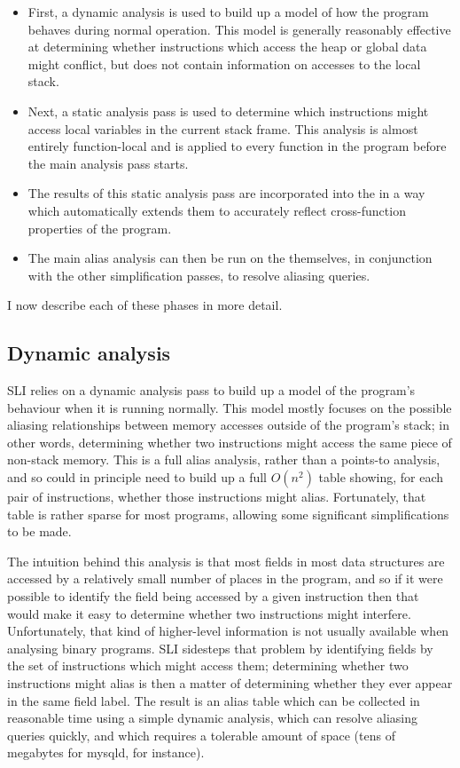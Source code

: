 \begin{itemize}
\item
  First, a dynamic analysis is used to build up a model of how the
  program behaves during normal operation.  This model is generally
  reasonably effective at determining whether instructions which
  access the heap or global data might conflict, but does not contain
  information on accesses to the local stack.
\item
  Next, a static analysis pass is used to determine which instructions
  might access local variables in the current stack frame.  This
  analysis is almost entirely function-local and is applied to every
  function in the program before the main analysis pass starts.
\item
  The results of this static analysis pass are incorporated into the
  {\StateMachines} in a way which automatically extends them to
  accurately reflect cross-function properties of the program.
\item
  The main alias analysis can then be run on the {\StateMachines}
  themselves, in conjunction with the other {\StateMachine}
  simplification passes, to resolve aliasing queries.
\end{itemize}

I now describe each of these phases in more detail.

\subsection{Dynamic analysis}

SLI relies on a dynamic analysis pass to build up a model of the
program's behaviour when it is running normally.  This model mostly
focuses on the possible aliasing relationships between memory accesses
outside of the program's stack; in other words, determining whether
two instructions might access the same piece of non-stack memory.
This is a full alias analysis, rather than a points-to analysis, and
so could in principle need to build up a full $O(n^2)$ table showing,
for each pair of instructions, whether those instructions might alias.
Fortunately, that table is rather sparse for most programs, allowing
some significant simplifications to be made.

The intuition behind this analysis is that most fields in most data
structures are accessed by a relatively small number of places in the
program, and so if it were possible to identify the field being
accessed by a given instruction then that would make it easy to
determine whether two instructions might interfere.
Unfortunately, that kind of higher-level information is not usually
available when analysing binary programs.  SLI sidesteps that problem
by identifying fields by the set of instructions which might access
them; determining whether two instructions might alias is then a
matter of determining whether they ever appear in the same field
label.  The result is an alias table which can be collected in
reasonable time using a simple dynamic analysis, which can resolve
aliasing queries quickly, and which requires a tolerable amount of
space (tens of megabytes for mysqld, for instance).

